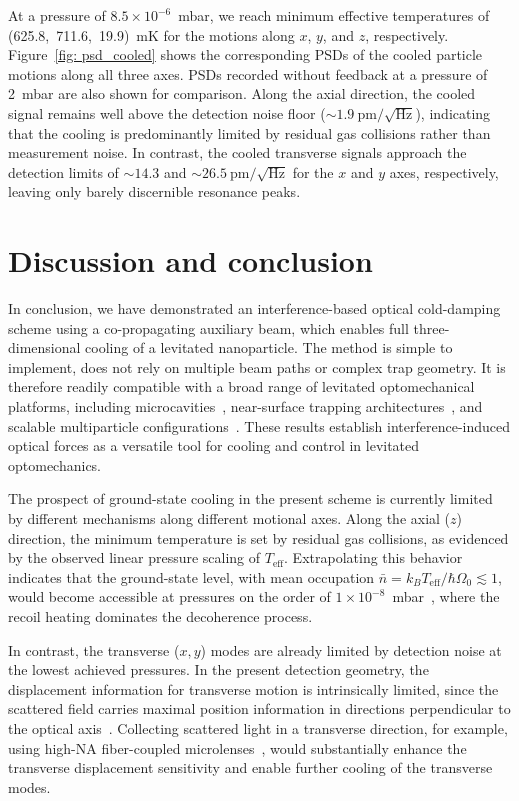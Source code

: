 \documentclass[%
 reprint,
 amsmath,amssymb,
 aps,
prl,
]{revtex4-2}
\begin{document}
At a pressure of $8.5\times10^{-6}$~mbar, we reach minimum effective temperatures of (625.8,\, 711.6,\, 19.9)~mK for the motions along $x$, $y$, and $z$, respectively. Figure~\ref{fig: psd_cooled} shows the corresponding PSDs of the cooled particle motions along all three axes. PSDs recorded without feedback at a pressure of 2~mbar are also shown for comparison. Along the axial direction, the cooled signal remains well above the detection noise floor ($\sim 1.9~\mathrm{pm}/\sqrt{\mathrm{Hz}}$), indicating that the cooling is predominantly limited by residual gas collisions rather than measurement noise. In contrast, the cooled transverse signals approach the detection limits of $\sim 14.3$ and $\sim 26.5~\mathrm{pm}/\sqrt{\mathrm{Hz}}$ for the $x$ and $y$ axes, respectively, leaving only barely discernible resonance peaks.

\section{Discussion and conclusion}

In conclusion, we have demonstrated an interference-based optical cold-damping scheme using a co-propagating auxiliary beam, which enables full three-dimensional cooling of a levitated nanoparticle. The method is simple to implement, does not rely on multiple beam paths or complex trap geometry. It is therefore readily compatible with a broad range of levitated optomechanical platforms, including microcavities~\cite{magrini_near-field_2018, alavi_enhanced_2025}, near-surface trapping architectures~\cite{diehl_optical_2018, ju_near-field_2023}, and scalable multiparticle configurations~\cite{vijayan_scalable_2023}. These results establish interference-induced optical forces as a versatile tool for cooling and control in levitated optomechanics.

The prospect of ground-state cooling in the present scheme is currently limited by different mechanisms along different motional axes. Along the axial ($z$) direction, the minimum temperature is set by residual gas collisions, as evidenced by the observed linear pressure scaling of $T_{\mathrm{eff}}$. Extrapolating this behavior indicates that the ground-state level, with mean occupation $\bar{n} = k_B T_{\mathrm{eff}}/\hbar\Omega_0\lesssim 1$, would become accessible at pressures on the order of $1 \times 10^{-8}$~mbar~\cite{magrini_real-time_2021,kamba_optical_2022}, where the recoil heating dominates the decoherence process.

In contrast, the transverse ($x,y$) modes are already limited by detection noise at the lowest achieved pressures. In the present detection geometry, the displacement information for transverse motion is intrinsically limited, since the scattered field carries maximal position information in directions perpendicular to the optical axis~\cite{tebbenjohanns_optimal_2019}. Collecting scattered light in a transverse direction, for example, using high-NA fiber-coupled microlenses~\cite{alavi_compact_2026}, would substantially enhance the transverse displacement sensitivity and enable further cooling of the transverse modes.
\end{document}
